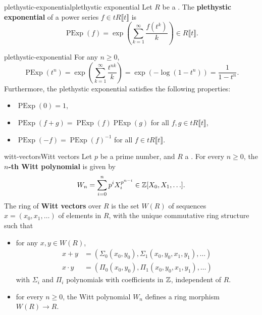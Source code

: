 \begin{topic}{plethystic-exponential}{plethystic exponential}
    Let $R$ be a . The \textbf{plethystic exponential} of a power series $f \in t R \llbracket t \rrbracket$ is 
    \[ \operatorname{PExp}(f) = \exp \left( \sum_{k = 1}^{\infty} \frac{f(t^k)}{k} \right) \in R \llbracket t \rrbracket . \]
\end{topic}

\begin{example}{plethystic-exponential}
    For any $n \ge 0$,
    \[ \operatorname{PExp}(t^n) = \exp \left( \sum_{k = 1}^{\infty} \frac{t^{nk}}{k} \right) = \exp \left( - \log(1 - t^n) \right) = \frac{1}{1 - t^n} . \]
    Furthermore, the plethystic exponential satisfies the following properties:
    \begin{itemize}
        \item $\operatorname{PExp}(0) = 1$,
        \item $\operatorname{PExp}(f + g) = \operatorname{PExp}(f) \operatorname{PExp}(g)$ for all $f, g \in t R \llbracket t \rrbracket$,
        \item $\operatorname{PExp}(-f) = \operatorname{PExp}(f)^{-1}$ for all $f \in t R \llbracket t \rrbracket$.
    \end{itemize}
    
\end{example}

\begin{topic}{witt-vectors}{Witt vectors}
    Let $p$ be a prime number, and $R$ a . For every $n \ge 0$, the \textbf{$n$-th Witt polynomial} is given by
    \[ W_n = \sum_{i = 0}^{n} p^i X_i^{p^{n - i}} \in \mathbb{Z}[X_0, X_1, \ldots] . \]
    The ring of \textbf{Witt vectors} over $R$ is the set $W(R)$ of sequences $x = (x_0, x_1, \ldots)$ of elements in $R$, with the unique commutative ring structure such that
    \begin{itemize}
        \item for any $x, y \in W(R)$,
        \[ \begin{aligned}
            x + y &= (\Sigma_0(x_0, y_0), \Sigma_1(x_0, y_0, x_1, y_1), \ldots) \\
            x \cdot y &= (\Pi_0(x_0, y_0), \Pi_1(x_0, y_0, x_1, y_1), \ldots)
        \end{aligned} \]
        with $\Sigma_i$ and $\Pi_i$ polynomials with coefficients in $\mathbb{Z}$, independent of $R$.
        \item for every $n \ge 0$, the Witt polynomial $W_n$ defines a ring morphism $W(R) \to R$.
    \end{itemize}
\end{topic}

